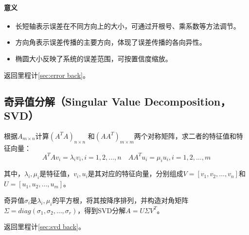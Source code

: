 \documentclass[
12pt, %
a4paper, 
oneside, %
headinclude,footinclude, %
]{scrartcl}
\begin{document}
\paragraph{意义}
\begin{itemize}
\item 长短轴表示误差在不同方向上的大小，可通过开根号、乘系数等方法调节。
\item 方向角表示误差传播的主要方向，体现了误差传播的各向异性。
\item 椭圆大小反映了系统的误差范围，可按置信度缩放。
\end{itemize}

返回里程计\ref{sec:error back}。
\subsection[奇异值分解]{奇异值分解（Singular Value Decomposition，SVD）}\label{sec:svd}
根据$ A_{m \times n} $计算$ (A^T A)_{n \times n} $ 和$ (A A^T)_{m \times m} $两个对称矩阵，求二者的特征值和特征向量：
$$ A^T A v_i = \lambda_i v_i, i = 1, 2, \dots, n \quad A A^T u_i = \mu_i u_i, i = 1, 2, \dots, m $$

其中，$ \lambda_i, \mu_i $是特征值，$ v_i, u_i $是其对应的特征向量，分别组成$ V = [v_1, v_2, \dots, v_n] $和$ U = [u_1, u_2, \dots, u_m] $。

奇异值$ \sigma_i $是$ \lambda_i, \mu_i $的平方根，将其按降序排列，并构造对角矩阵$ \Sigma = diag(\sigma_1, \sigma_2, \dots, \sigma_r) $，得到SVD分解$ A = U \Sigma V^T $。

返回里程计\ref{sec:svd back}。
\end{document}

